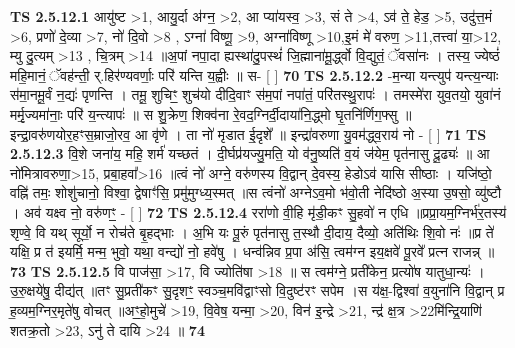 \documentclass[17pt]{extarticle}
\begin{document}
                                        \textbf{ TS 2.5.12.1} \newline
                  आयु॑ष्ट >1, आयु॒र्दा अ॑ग्न॒ >2, आ प्या॑यस्व॒ >3, सं ते >4, ऽव॑ ते॒ हेड॒ >5, उदु॑त्त॒मं >6, प्रणो॑ दे॒व्या >7, नो॑ दि॒वो >8 , ऽग्ना॑ विष्णू॒ >9, अग्ना॑विष्णू >10,इ॒मं मे॑ वरुण॒ >11,तत्त्वा॑ या॒>12, म्यु दु॒त्यम् >13 , चि॒त्रम् >14 ॥अ॒पां नपा॒दा ह्यस्था॑दु॒पस्थं॑ जि॒ह्माना॑मू॒र्द्ध्वो वि॒द्युतं॒ ॅवसा॑नः । तस्य॒ ज्येष्ठं॑ महि॒मानं॒ ॅवह॑न्ती॒ र्.हिर॑ण्यवर्णाः॒ परि॑ यन्ति य॒ह्वीः ॥ स-  [  ] \textbf{  70} \newline
                  \newline
                                \textbf{ TS 2.5.12.2} \newline
                  -म॒न्या यन्त्युप॑ यन्त्य॒न्याः स॑मा॒नमू॒र्वं न॒द्यः॑ पृणन्ति । तमू॒ शुचिꣳ॒॒ शुच॑यो दीदि॒वाꣳ स॑म॒पां नपा॑तं॒ परि॑तस्थु॒रापः॑ । तमस्मे॑रा युव॒तयो॒ युवा॑नं मर्मृ॒ज्यमा॑नाः॒ परि॑ य॒न्त्यापः॑ ॥ स शु॒क्रेण॒ शिक्व॑ना रे॒वद॒ग्निर्दी॒दाया॑नि॒द्ध्मो घृ॒तनि॑र्णिग॒फ्सु ॥इन्द्रा॒वरु॑णयोर॒हꣳस॒म्राजो॒रव॒ आ वृ॑णे । ता नो॑ मृडात ई॒दृशे᳚ ॥ इन्द्रा॑वरुणा यु॒वम॑द्ध्व॒राय॑ नो - [  ] \textbf{  71} \newline
                  \newline
                                \textbf{ TS 2.5.12.3} \newline
                  वि॒शे जना॑य॒ महि॒ शर्म॑ यच्छतं । दी॒र्घप्र॑यज्यु॒मति॒ यो व॑नु॒ष्यति॑ व॒यं ज॑येम॒ पृत॑नासु दू॒ढ्यः॑ ॥ आ नो॑मित्रावरुणा॒>15, प्रबा॒हवा᳚>16 ॥त्वं नो॑ अग्ने॒ वरु॑णस्य वि॒द्वान् दे॒वस्य॒ हेडोऽव॑ यासि सीष्ठाः । यजि॑ष्ठो॒ वह्नि॑ तमः॒ शोशु॑चानो॒ विश्वा॒ द्वेषाꣳ॑सि॒ प्रमु॑मुग्ध्य॒स्मत् ॥स त्वंनो॑ अग्नेऽव॒मो भ॑वो॒ती नेदि॑ष्ठो अ॒स्या उ॒षसो॒ व्यु॑ष्टौ । अव॑ यक्ष्व नो॒ वरु॑णꣳ॒॒ - [  ] \textbf{  72} \newline
                  \newline
                                \textbf{ TS 2.5.12.4} \newline
                  ररा॑णो वी॒हि मृ॑डी॒कꣳ सु॒हवो॑ न एधि ॥प्रप्रा॒यम॒ग्निर्भ॑र॒तस्य॑ शृण्वे॒ वि यथ् सूर्यो॒ न रोच॑ते बृ॒हद्भाः । अ॒भि यः पू॒रुं पृत॑नासु त॒स्थौ दी॒दाय॒ दैव्यो॒ अति॑थिः शि॒वो नः॑ ॥प्र ते॑ यक्षि॒ प्र त॑ इयर्मि॒ मन्म॒ भुवो॒ यथा॒ वन्द्यो॑ नो॒ हवे॑षु । धन्व॑न्निव प्र॒पा अ॑सि॒ त्वम॑ग्न इय॒क्षवे॑ पू॒रवे᳚ प्रत्न राजन्न् ॥ \textbf{  73} \newline
                  \newline
                                \textbf{ TS 2.5.12.5} \newline
                  वि पाज॑सा॒ >17, वि ज्योति॑षा >18 ॥ स त्वम॑ग्ने॒ प्रती॑केन॒ प्रत्यो॑ष यातुधा॒न्यः॑ । उ॒रु॒क्षये॑षु॒ दीद्य॑त् ॥तꣳ सु॒प्रती॑कꣳ सु॒दृशꣳ॒॒ स्वञ्च॒मवि॑द्वाꣳसो वि॒दुष्ट॑रꣳ सपेम ।स य॑क्ष॒-द्विश्वा॑ व॒युना॑नि वि॒द्वान् प्र ह॒व्यम॒ग्निर॒मृते॑षु वोचत् ॥अꣳ॒॒हो॒मुचे॑ >19, वि॒वेष॒ यन्मा॒ >20, विन॑ इ॒न्द्रे >21, न्द्र॑ क्ष॒त्र >22मि॑न्द्रि॒याणि॑ शतक्र॒तो >23, ऽनु॑ ते दायि >24 ॥ \textbf{  74 } \newline
\end{document}
